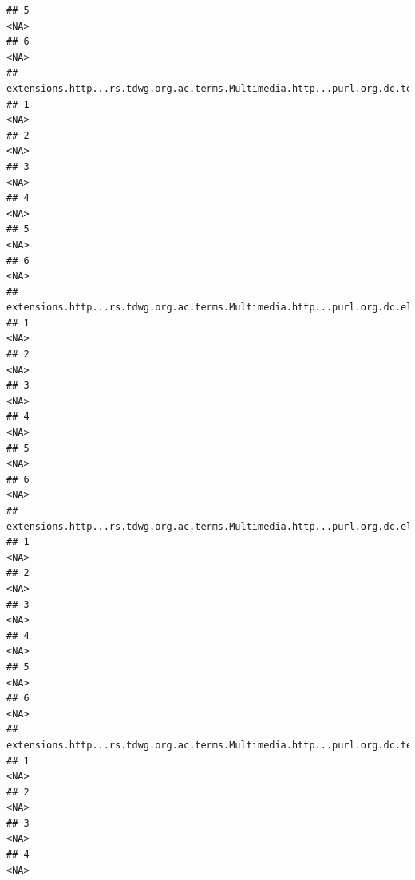 \documentclass[
]{book}
\begin{document}
\begin{verbatim}
## 5                                                                                         <NA>
## 6                                                                                         <NA>
##   extensions.http...rs.tdwg.org.ac.terms.Multimedia.http...purl.org.dc.terms.rights.4
## 1                                                                                <NA>
## 2                                                                                <NA>
## 3                                                                                <NA>
## 4                                                                                <NA>
## 5                                                                                <NA>
## 6                                                                                <NA>
##   extensions.http...rs.tdwg.org.ac.terms.Multimedia.http...purl.org.dc.elements.1.1.type.4
## 1                                                                                     <NA>
## 2                                                                                     <NA>
## 3                                                                                     <NA>
## 4                                                                                     <NA>
## 5                                                                                     <NA>
## 6                                                                                     <NA>
##   extensions.http...rs.tdwg.org.ac.terms.Multimedia.http...purl.org.dc.elements.1.1.creator.4
## 1                                                                                        <NA>
## 2                                                                                        <NA>
## 3                                                                                        <NA>
## 4                                                                                        <NA>
## 5                                                                                        <NA>
## 6                                                                                        <NA>
##   extensions.http...rs.tdwg.org.ac.terms.Multimedia.http...purl.org.dc.terms.format.4
## 1                                                                                <NA>
## 2                                                                                <NA>
## 3                                                                                <NA>
## 4                                                                                <NA>

\end{verbatim}
\end{document}
